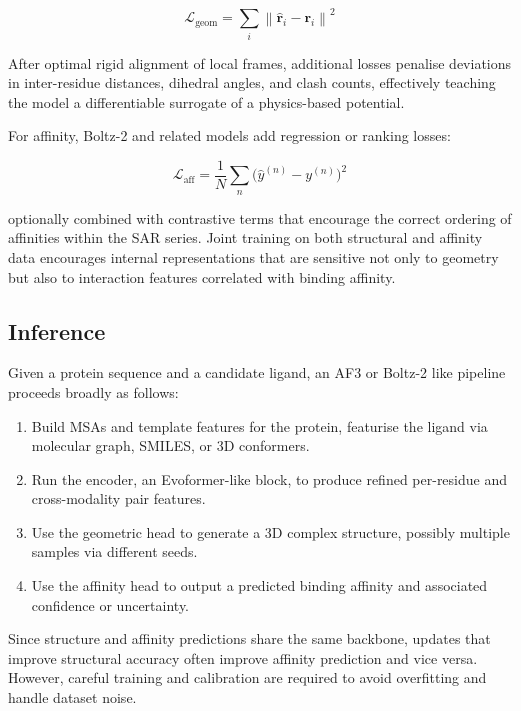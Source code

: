 \documentclass[12pt]{article}
\begin{document}
\begin{equation}
\mathcal{L}_{\text{geom}} = \sum_{i} \left\| \hat{\mathbf{r}}_i - \mathbf{r}_i \right\|^2
\end{equation}

After optimal rigid alignment of local frames, additional losses penalise deviations in inter-residue distances, dihedral angles, and clash counts, effectively teaching the model a differentiable surrogate of a physics-based potential\cite{CH13_jumper2021alphafold,CH13_alphafoldreview2021,CH13_passaro2025boltz2}.

For affinity, Boltz-2 and related models\cite{CH13_passaro2025boltz2} add regression or ranking losses:

\begin{equation}
\mathcal{L}_{\text{aff}} = \frac{1}{N} \sum_{n} \big(\hat{y}^{(n)} - y^{(n)}\big)^2
\end{equation}

optionally combined with contrastive terms that encourage the correct ordering of affinities within the SAR series. Joint training on both structural and affinity data encourages internal representations that are sensitive not only to geometry but also to interaction features correlated with binding affinity.

\subsection{Inference}

Given a protein sequence and a candidate ligand, an AF3 or Boltz-2\cite{CH13_proteinpredictionuntilcasp15,CH13_passaro2025boltz2} like pipeline proceeds broadly as follows:
\begin{enumerate}
  \item Build MSAs and template features for the protein, featurise the ligand via molecular graph, SMILES, or 3D conformers.
  \item Run the encoder, an Evoformer-like block, to produce refined per-residue and cross-modality pair features.
  \item Use the geometric head to generate a 3D complex structure, possibly multiple samples via different seeds.
  \item Use the affinity head to output a predicted binding affinity and associated confidence or uncertainty.
\end{enumerate}
Since structure and affinity predictions share the same backbone, updates that improve structural accuracy often improve affinity prediction and vice versa. However, careful training and calibration are required to avoid overfitting and handle dataset noise\cite{CH13_passaro2025boltz2,CH13_wan2026reliability}.
\end{document}
